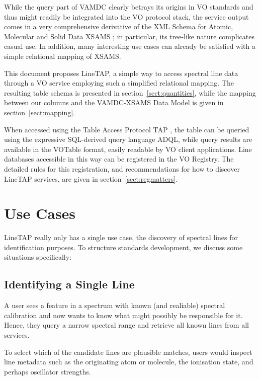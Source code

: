 \documentclass[11pt,a4paper]{ivoa}
\begin{document}
While the query part of VAMDC clearly betrays its origins in VO
standards and thus might readily be integrated into the VO protocol
stack, the service output comes in a very comprehensive derivative of
the XML Schema for Atomic, Molecular and Solid Data XSAMS
\citep{XSAMS:Docs}; in particular, its tree-like nature complicates
casual use.  In addition, many interesting use cases can already be
satisfied with a simple relational mapping of XSAMS. 

This document proposes LineTAP, a simple way to access spectral line
data through a VO service employing such a simplified relational
mapping.  The resulting table schema is presented in
section~\ref{sect:quantities}, while the mapping between our columns and the
VAMDC-XSAMS Data Model is given in section~\ref{sect:mapping}.

When accessed using the Table Access Protocol TAP
\citep{2019ivoa.spec.0927D}, the table can be queried using the
expressive SQL-derived query language ADQL, while query results are
available in the VOTable format, easily readable by VO client
applications.  Line databases accessible in this way can be registered
in the VO Registry.  The detailed rules for this registration, and
recommendations for how to discover LineTAP services, are given in
section~\ref{sect:regmatters}.



\section{Use Cases}
\label{sect:use-cases}

LineTAP really only has a single use case, the discovery of spectral
lines for identification purposes.  To structure standards development,
we discuss some situations specifically:

\subsection{Identifying a Single Line}

A user sees a feature in a spectrum with known (and realiable) spectral
calibration and now wants to know what might possibly be responsible for
it.  Hence, they query a narrow spectral range and retrieve all known
lines from all services.

To select which of the candidate lines are plausible matches, users
would inspect line metadata such as the originating atom or molecule, the
ionisation state, and perhaps oscillator strengths.
\end{document}
